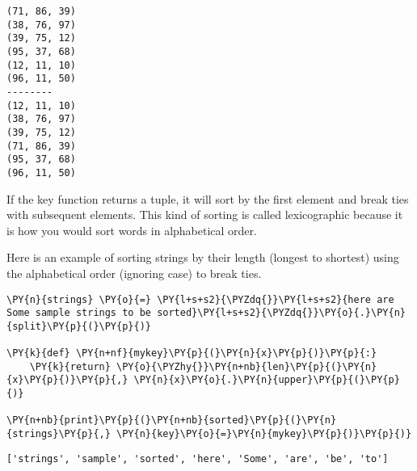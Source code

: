 \begin{Verbatim}
(71, 86, 39)
(38, 76, 97)
(39, 75, 12)
(95, 37, 68)
(12, 11, 10)
(96, 11, 50)
--------
(12, 11, 10)
(38, 76, 97)
(39, 75, 12)
(71, 86, 39)
(95, 37, 68)
(96, 11, 50)

\end{Verbatim}


If the key function returns a tuple, it will sort by the first element and break ties with subsequent elements.  This kind of sorting is called lexicographic because it is how you would sort words in alphabetical order.


Here is an example of sorting strings by their length (longest to shortest) using the alphabetical order (ignoring case) to break ties.


\begin{Verbatim}[commandchars=\\\{\}]
\PY{n}{strings} \PY{o}{=} \PY{l+s+s2}{\PYZdq{}}\PY{l+s+s2}{here are Some sample strings to be sorted}\PY{l+s+s2}{\PYZdq{}}\PY{o}{.}\PY{n}{split}\PY{p}{(}\PY{p}{)}

\PY{k}{def} \PY{n+nf}{mykey}\PY{p}{(}\PY{n}{x}\PY{p}{)}\PY{p}{:}
    \PY{k}{return} \PY{o}{\PYZhy{}}\PY{n+nb}{len}\PY{p}{(}\PY{n}{x}\PY{p}{)}\PY{p}{,} \PY{n}{x}\PY{o}{.}\PY{n}{upper}\PY{p}{(}\PY{p}{)}

\PY{n+nb}{print}\PY{p}{(}\PY{n+nb}{sorted}\PY{p}{(}\PY{n}{strings}\PY{p}{,} \PY{n}{key}\PY{o}{=}\PY{n}{mykey}\PY{p}{)}\PY{p}{)}
\end{Verbatim}

\begin{Verbatim}
['strings', 'sample', 'sorted', 'here', 'Some', 'are', 'be', 'to']

\end{Verbatim}
